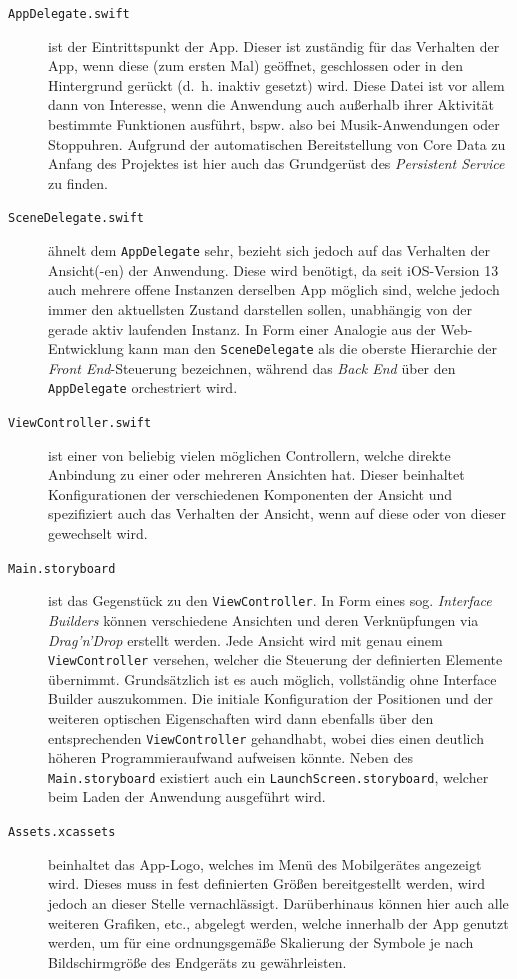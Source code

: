 \begin{description}
	\item[\texttt{AppDelegate.swift}] ist der Eintrittspunkt der App. Dieser ist zuständig für das Verhalten der App, wenn diese (zum ersten Mal) geöffnet, geschlossen oder in den Hintergrund gerückt (d.\ h. inaktiv gesetzt) wird. Diese Datei ist vor allem dann von Interesse, wenn die Anwendung auch außerhalb ihrer Aktivität bestimmte Funktionen ausführt, bspw. also bei Musik-Anwendungen oder Stoppuhren. Aufgrund der automatischen Bereitstellung von Core Data zu Anfang des Projektes ist hier auch das Grundgerüst des \textit{Persistent Service} zu finden.
	\item[\texttt{SceneDelegate.swift}] ähnelt dem \texttt{AppDelegate} sehr, bezieht sich jedoch auf das Verhalten der Ansicht(-en) der Anwendung. Diese wird benötigt, da seit iOS-Version 13 auch mehrere offene Instanzen derselben App möglich sind, welche jedoch immer den aktuellsten Zustand darstellen sollen, unabhängig von der gerade aktiv laufenden Instanz. In Form einer Analogie aus der Web-Entwicklung kann man den \texttt{SceneDelegate} als die oberste Hierarchie der \textit{Front End}-Steuerung bezeichnen, während das \textit{Back End} über den \texttt{AppDelegate} orchestriert wird.
	\item[\texttt{ViewController.swift}] ist einer von beliebig vielen möglichen Controllern, welche direkte Anbindung zu einer oder mehreren Ansichten hat. Dieser beinhaltet Konfigurationen der verschiedenen Komponenten der Ansicht und spezifiziert auch das Verhalten der Ansicht, wenn auf diese oder von dieser gewechselt wird.
	\item[\texttt{Main.storyboard}] ist das Gegenstück zu den \texttt{ViewController}. In Form eines sog. \textit{Interface Builders} können verschiedene Ansichten und deren Verknüpfungen via \textit{Drag'n'Drop} erstellt werden. Jede Ansicht wird mit genau einem \texttt{ViewController} versehen, welcher die Steuerung der definierten Elemente übernimmt. Grundsätzlich ist es auch möglich, vollständig ohne Interface Builder auszukommen. Die initiale Konfiguration der Positionen und der weiteren optischen Eigenschaften wird dann ebenfalls über den entsprechenden \texttt{ViewController} gehandhabt, wobei dies einen deutlich höheren Programmieraufwand aufweisen könnte. Neben des \texttt{Main.storyboard} existiert auch ein \texttt{LaunchScreen.storyboard}, welcher beim Laden der Anwendung ausgeführt wird.
	\item[\texttt{Assets.xcassets}] beinhaltet das App-Logo, welches im Menü des Mobilgerätes angezeigt wird. Dieses muss in fest definierten Größen bereitgestellt werden, wird jedoch an dieser Stelle vernachlässigt. Darüberhinaus können hier auch alle weiteren Grafiken, etc., abgelegt werden, welche innerhalb der App genutzt werden, um für eine ordnungsgemäße Skalierung der Symbole je nach Bildschirmgröße des Endgeräts zu gewährleisten.

\end{description}
